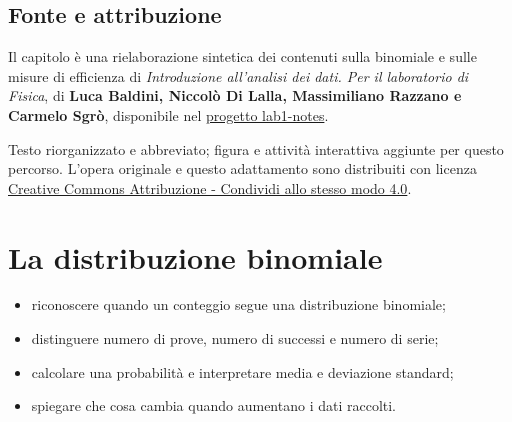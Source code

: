 \documentclass[
  italian,
  letterpaper,
  DIV=11,
  numbers=noendperiod]{scrreprt}
\providecommand{\tightlist}{%
  \setlength{\itemsep}{0pt}\setlength{\parskip}{0pt}}
\begin{document}
\section*{Fonte e attribuzione}\label{fonte-e-attribuzione}


Il capitolo è una rielaborazione sintetica dei contenuti sulla binomiale
e sulle misure di efficienza di \emph{Introduzione all'analisi dei dati.
Per il laboratorio di Fisica}, di \textbf{Luca Baldini, Niccolò Di
Lalla, Massimiliano Razzano e Carmelo Sgrò}, disponibile nel
\href{https://github.com/unipi-physics-labs/lab1-notes}{progetto
lab1-notes}.

Testo riorganizzato e abbreviato; figura e attività interattiva aggiunte
per questo percorso. L'opera originale e questo adattamento sono
distribuiti con licenza
\href{https://creativecommons.org/licenses/by-sa/4.0/}{Creative Commons
Attribuzione - Condividi allo stesso modo 4.0}.


\chapter{La distribuzione binomiale}\label{sec-binomiale}

\begin{tcolorbox}[enhanced jigsaw, arc=.35mm, bottomrule=.15mm, bottomtitle=1mm, breakable, colback=white, colbacktitle=quarto-callout-note-color!10!white, colframe=quarto-callout-note-color-frame, coltitle=black, left=2mm, leftrule=.75mm, opacityback=0, opacitybacktitle=0.6, rightrule=.15mm, title={Alla fine del capitolo sai\ldots{}}, titlerule=0mm, toprule=.15mm, toptitle=1mm]

\begin{itemize}
\tightlist
\item
  riconoscere quando un conteggio segue una distribuzione binomiale;
\item
  distinguere numero di prove, numero di successi e numero di serie;
\item
  calcolare una probabilità e interpretare media e deviazione standard;
\item
  spiegare che cosa cambia quando aumentano i dati raccolti.
\end{itemize}

\end{tcolorbox}
\end{document}
